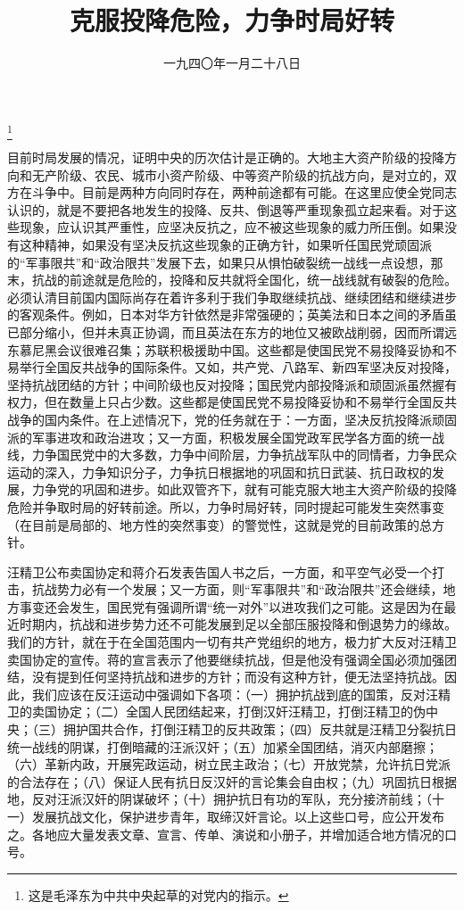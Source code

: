 
\title{克服投降危险，力争时局好转}
\date{一九四〇年一月二十八日}
\thanks{这是毛泽东为中共中央起草的对党内的指示。}
\maketitle


目前时局发展的情况，证明中央的历次估计是正确的。大地主大资产阶级的投降方向和无产阶级、农民、城市小资产阶级、中等资产阶级的抗战方向，是对立的，双方在斗争中。目前是两种方向同时存在，两种前途都有可能。在这里应使全党同志认识的，就是不要把各地发生的投降、反共、倒退等严重现象孤立起来看。对于这些现象，应认识其严重性，应坚决反抗之，应不被这些现象的威力所压倒。如果没有这种精神，如果没有坚决反抗这些现象的正确方针，如果听任国民党顽固派的“军事限共”和“政治限共”发展下去，如果只从惧怕破裂统一战线一点设想，那末，抗战的前途就是危险的，投降和反共就将全国化，统一战线就有破裂的危险。必须认清目前国内国际尚存在着许多利于我们争取继续抗战、继续团结和继续进步的客观条件。例如，日本对华方针依然是非常强硬的；英美法和日本之间的矛盾虽已部分缩小，但并未真正协调，而且英法在东方的地位又被欧战削弱，因而所谓远东慕尼黑会议很难召集；苏联积极援助中国。这些都是使国民党不易投降妥协和不易举行全国反共战争的国际条件。又如，共产党、八路军、新四军坚决反对投降，坚持抗战团结的方针；中间阶级也反对投降；国民党内部投降派和顽固派虽然握有权力，但在数量上只占少数。这些都是使国民党不易投降妥协和不易举行全国反共战争的国内条件。在上述情况下，党的任务就在于：一方面，坚决反抗投降派顽固派的军事进攻和政治进攻；又一方面，积极发展全国党政军民学各方面的统一战线，力争国民党中的大多数，力争中间阶层，力争抗战军队中的同情者，力争民众运动的深入，力争知识分子，力争抗日根据地的巩固和抗日武装、抗日政权的发展，力争党的巩固和进步。如此双管齐下，就有可能克服大地主大资产阶级的投降危险并争取时局的好转前途。所以，力争时局好转，同时提起可能发生突然事变（在目前是局部的、地方性的突然事变）的警觉性，这就是党的目前政策的总方针。

汪精卫公布卖国协定和蒋介石发表告国人书之后，一方面，和平空气必受一个打击，抗战势力必有一个发展；又一方面，则“军事限共”和“政治限共”还会继续，地方事变还会发生，国民党有强调所谓“统一对外”以进攻我们之可能。这是因为在最近时期内，抗战和进步势力还不可能发展到足以全部压服投降和倒退势力的缘故。我们的方针，就在于在全国范围内一切有共产党组织的地方，极力扩大反对汪精卫卖国协定的宣传。蒋的宣言表示了他要继续抗战，但是他没有强调全国必须加强团结，没有提到任何坚持抗战和进步的方针；而没有这种方针，便无法坚持抗战。因此，我们应该在反汪运动中强调如下各项：（一）拥护抗战到底的国策，反对汪精卫的卖国协定；（二）全国人民团结起来，打倒汉奸汪精卫，打倒汪精卫的伪中央；（三）拥护国共合作，打倒汪精卫的反共政策；（四）反共就是汪精卫分裂抗日统一战线的阴谋，打倒暗藏的汪派汉奸；（五）加紧全国团结，消灭内部磨擦；（六）革新内政，开展宪政运动，树立民主政治；（七）开放党禁，允许抗日党派的合法存在；（八）保证人民有抗日反汉奸的言论集会自由权；（九）巩固抗日根据地，反对汪派汉奸的阴谋破坏；（十）拥护抗日有功的军队，充分接济前线；（十一）发展抗战文化，保护进步青年，取缔汉奸言论。以上这些口号，应公开发布之。各地应大量发表文章、宣言、传单、演说和小册子，并增加适合地方情况的口号。

